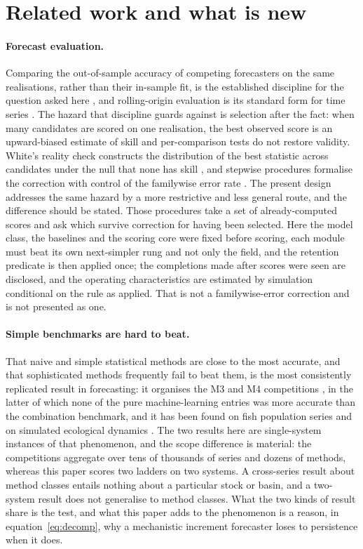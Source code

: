 \FloatBarrier
\section{Related work and what is new}\label{sec:related}

\paragraph{Forecast evaluation.} Comparing the out-of-sample accuracy of competing forecasters on the same realisations, rather than their in-sample fit, is the established discipline for the question asked here \citep{Diebold1995,HyndmanKoehler2006,HyndmanAthanasopoulos2021}, and rolling-origin evaluation is its standard form for time series \citep{Tashman2000,Bergmeir2012}. The hazard that discipline guards against is selection after the fact: when many candidates are scored on one realisation, the best observed score is an upward-biased estimate of skill and per-comparison tests do not restore validity. White's reality check constructs the distribution of the best statistic across candidates under the null that none has skill \citep{White2000}, and stepwise procedures formalise the correction with control of the familywise error rate \citep{RomanoWolf2005}. The present design addresses the same hazard by a more restrictive and less general route, and the difference should be stated. Those procedures take a set of already-computed scores and ask which survive correction for having been selected. Here the model class, the baselines and the scoring core were fixed before scoring, each module must beat its own next-simpler rung and not only the field, and the retention predicate is then applied once; the completions made after scores were seen are disclosed, and the operating characteristics are estimated by simulation conditional on the rule as applied. That is not a familywise-error correction and is not presented as one.

\paragraph{Simple benchmarks are hard to beat.} That naive and simple statistical methods are close to the most accurate, and that sophisticated methods frequently fail to beat them, is the most consistently replicated result in forecasting: it organises the M3 and M4 competitions \citep{Makridakis2000,Makridakis2018}, in the latter of which none of the pure machine-learning entries was more accurate than the combination benchmark, and it has been found on fish population series \citep{Ward2014} and on simulated ecological dynamics \citep{Perretti2013}. The two results here are single-system instances of that phenomenon, and the scope difference is material: the competitions aggregate over tens of thousands of series and dozens of methods, whereas this paper scores two ladders on two systems. A cross-series result about method classes entails nothing about a particular stock or basin, and a two-system result does not generalise to method classes. What the two kinds of result share is the test, and what this paper adds to the phenomenon is a reason, in equation~\eqref{eq:decomp}, why a mechanistic increment forecaster loses to persistence when it does.


